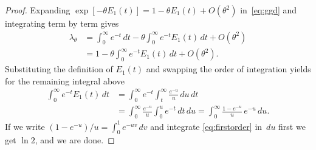 \documentclass[10pt,a4paper]{amsart}
\begin{document}
\begin{proof}
Expanding $\exp[-\theta E_{1}(t)] = 1-\theta E_{1}(t) + O(\theta^{2})$ in~\eqref{eq:ggd} and integrating term by term gives
\begin{equation}
\begin{split}
\lambda_{\theta} &= \int_{0}^{\infty} e^{-t}\,dt 
-\theta\int_{0}^{\infty} e^{-t} E_{1}(t)\,dt + O(\theta^{2}) \\
& = 1 - \theta \int_{0}^{\infty} e^{-t} E_{1}(t)\,dt + O(\theta^{2}).
\end{split}
\end{equation}
Substituting the definition of $E_{1}(t)$ and swapping the order of integration yields for the remaining integral above
\begin{equation}
\label{eq:firstorder}
\begin{split}
\int_{0}^{\infty} e^{-t} E_{1}(t)\,dt 
&= \int_{0}^{\infty} e^{-t} \int_{t}^{\infty} \frac{e^{-u}}{u}\,du\,dt \\
&= \int_{0}^{\infty} \frac{e^{-u}}{u} \int_{0}^{u} e^{-t}\,dt\,du 
= \int_{0}^{\infty} \frac{1 - e^{-u}}{u}\,e^{-u}\,du.
\end{split}
\end{equation}
If we write $(1-e^{-u})/u = \int_{0}^{1} e^{-uv}\,dv$ and integrate \eqref{eq:firstorder} in~$du$ first we get $\ln{2}$, and we are done.
\end{proof}
\end{document}
